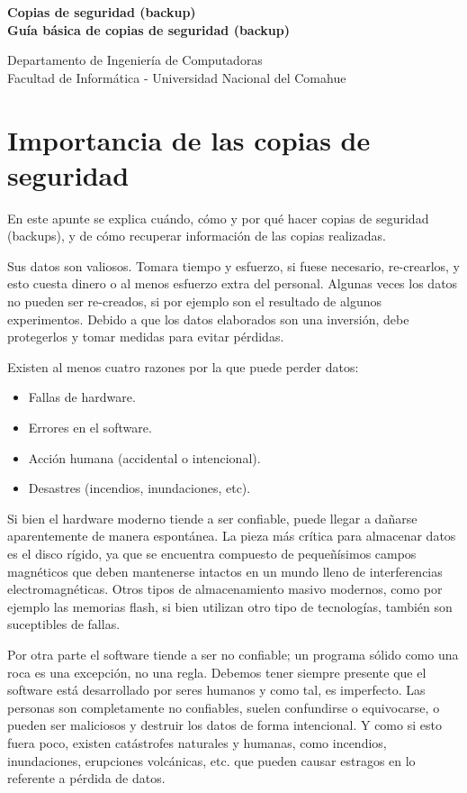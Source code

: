 \documentclass[12pt]{article}
\def\maketitle{

 \makeatletter
 {\color{bl} \centering \huge \sc \textbf{
 Copias de seguridad (backup)\\ 
\large \vspace*{-8pt} \color{black} Guía básica de copias de seguridad (backup)
 \vspace*{8pt} }\par}
 \makeatother


 \makeatletter
 {\centering \small 
 	Departamento de Ingeniería de Computadoras \\
 	Facultad de Informática - Universidad Nacional del Comahue \\
 	\vspace{20pt} }
 \makeatother

}
\begin{document}
\thispagestyle{empty}
\maketitle
\setlength{\parindent}{0pt}


\section*{Importancia de las copias de seguridad}
 En este apunte se explica cuándo, cómo y  por qué hacer copias de 
seguridad (backups), y de cómo recuperar información de las 
copias realizadas.

Sus datos son valiosos. Tomara tiempo y esfuerzo, si fuese necesario,
re-crearlos, y esto cuesta dinero o al menos esfuerzo extra del personal.
Algunas veces los datos no pueden ser re-creados, si por ejemplo son el 
resultado de algunos experimentos. Debido a que los datos elaborados son una 
inversión, debe protegerlos y tomar medidas para evitar pérdidas.

Existen al menos cuatro razones por la que puede perder datos: 
\begin{itemize}
\item Fallas de hardware.
\item Errores en el software. 
\item Acción humana (accidental o intencional). 
\item Desastres (incendios, inundaciones, etc). 
\end{itemize}

Si bien el hardware moderno tiende a ser confiable, puede llegar a dañarse
aparentemente de manera espontánea. La pieza más crítica para 
almacenar datos es el disco rígido, ya que se encuentra compuesto de 
pequeñísimos campos magnéticos que deben mantenerse intactos en un mundo 
lleno de interferencias electromagnéticas. Otros tipos de almacenamiento 
masivo modernos, como por ejemplo las memorias flash, si bien utilizan 
otro tipo de tecnologías, también son suceptibles de fallas.  

Por otra parte el software tiende a ser no confiable; un programa 
sólido como una roca es una excepción, no una regla. Debemos tener siempre
presente que el software está desarrollado por seres humanos y como tal, es
imperfecto. Las personas son completamente no confiables, suelen confundirse
o equivocarse, o pueden ser maliciosos y destruir los datos de forma 
intencional. Y como si esto fuera poco, existen catástrofes naturales y
humanas, como incendios, inundaciones, erupciones volcánicas, etc. 
que pueden causar estragos en lo referente a pérdida de datos.  
\end{document}
